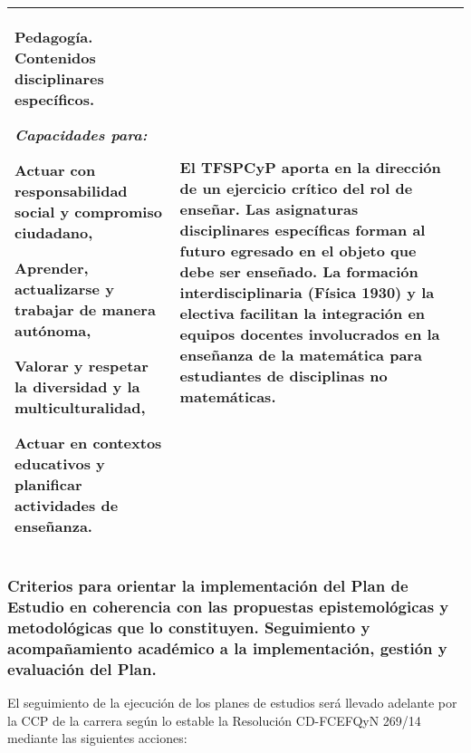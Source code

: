 \documentclass[a4paper, 12pt]{article}
\begin{document}
\begin{center}
\begin{xltabular}{1.0\textwidth}{|>{\raggedright\arraybackslash}X |
>{\raggedright\arraybackslash}X |
>{\raggedright\arraybackslash}X |
}
   Pedagogía.  Contenidos disciplinares específicos. 
   
   
   
   
   
   \emph{Capacidades para:}
  
   Actuar con responsabilidad social y compromiso ciudadano,
   
 Aprender, actualizarse y trabajar de manera autónoma,
 

 Valorar y respetar la diversidad y la multiculturalidad,
 
 
 Actuar en contextos educativos y planificar actividades de enseñanza.

  
  
  &  El TFSPCyP aporta en la dirección de un ejercicio crítico del rol de enseñar. Las asignaturas disciplinares específicas forman al futuro egresado en el objeto que debe ser enseñado. La formación interdisciplinaria (Física 1930) y la electiva  facilitan la integración en equipos docentes involucrados en la enseñanza de la matemática para estudiantes de disciplinas no matemáticas. \\ \hline
  
 
\end{xltabular}
\end{center}
\normalsize


\subsubsection{Criterios para orientar la implementación del Plan de Estudio en coherencia con las propuestas epistemológicas y metodológicas que lo constituyen. Seguimiento y acompañamiento académico a la implementación, gestión y evaluación del Plan.
} 
 

El seguimiento de la ejecución de los planes de estudios será llevado adelante por la CCP de la carrera según lo estable  la Resolución CD-FCEFQyN 269/14 mediante las siguientes acciones:
\end{document}
